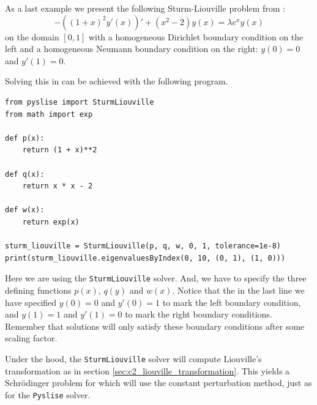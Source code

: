 As a last example we present the following Sturm-Liouville problem from \cite{siedlecki_sturmliouville_2016}:
$$
    -\left((1+x)^2 y'(x)\right)' + \left(x^2 - 2\right) y(x) = \lambda e^x y(x)
$$
on the domain $[0, 1]$ with a homogeneous Dirichlet boundary condition on the left and a homogeneous Neumann boundary condition on the right: $y(0) = 0$ and $y'(1) = 0$.

Solving this in \pyslise{} can be achieved with the following program.
\begin{verbatim}
from pyslise import SturmLiouville
from math import exp

def p(x):
    return (1 + x)**2

def q(x):
    return x * x - 2

def w(x):
    return exp(x)
    
sturm_liouville = SturmLiouville(p, q, w, 0, 1, tolerance=1e-8)
print(sturm_liouville.eigenvaluesByIndex(0, 10, (0, 1), (1, 0)))
\end{verbatim}

Here we are using the \texttt{SturmLiouville} solver. And, we have to specify the three defining functions $p(x)$, $q(y)$ and $w(x)$. Notice that the in the last line we have specified $y(0) = 0$ and $y'(0) = 1$ to mark the left boundary condition, and $y(1) = 1$ and $y'(1) = 0$ to mark the right boundary conditions. Remember that solutions will only satisfy these boundary conditions after some scaling factor.

Under the hood, the \texttt{SturmLiouville} solver will compute Liouville's transformation as in section \ref{sec:c2_liouville_transformation}. This yields a Schrödinger problem for which  will use the constant perturbation method, just as for the \texttt{Pyslise} solver.

